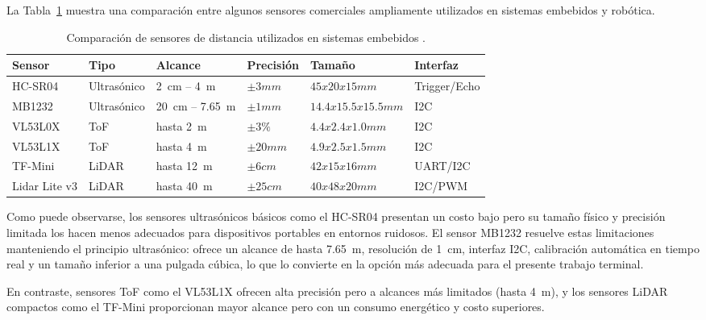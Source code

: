 La Tabla~\ref{tabla_sensores_completa} muestra una comparación entre algunos sensores comerciales ampliamente utilizados en sistemas embebidos y robótica.

\begin{table}[H]
\centering
\begin{tabular}{llllll}
\hline
Sensor & Tipo & Alcance & Precisión & Tamaño & Interfaz \\
\hline
HC-SR04 \cite{hcsr04_datasheet}          & Ultrasónico & 2~cm -- 4~m    & $\pm3 mm$    & $45x20x15 mm$      & Trigger/Echo \\
MB1232 \cite{mb1232_datasheet}           & Ultrasónico & 20~cm -- 7.65~m & $\pm1 mm$     & $14.4x15.5x15.5mm$ & I2C \\
VL53L0X \cite{vl53l0x_datasheet}         & ToF         & hasta 2~m      & $\pm3\%$     & $4.4x2.4x1.0 mm$ & I2C \\
VL53L1X \cite{vl53l1x_datasheet}         & ToF         & hasta 4~m      & $\pm20 mm$     & $4.9x2.5x1.5 mm$ & I2C \\
TF-Mini  \cite{tfmini_datasheet}          & LiDAR       & hasta 12~m     & $\pm6 cm$ & $42x15x16 mm$    & UART/I2C \\
Lidar Lite v3 \cite{lidarliitev3_manual}  & LiDAR       & hasta 40~m     & $\pm25 cm$ & $40x48x20 mm $      & I2C/PWM \\
\hline
\end{tabular}
\caption{Comparación de sensores de distancia utilizados en sistemas embebidos \cite{hcsr04_datasheet, mb1232_datasheet, vl53l0x_datasheet, vl53l1x_datasheet, tfmini_datasheet, lidarliitev3_manual}.}
\label{tabla_sensores_completa}
\end{table}

Como puede observarse, los sensores ultrasónicos básicos como el HC-SR04 \cite{hcsr04_datasheet} presentan un costo bajo pero su tamaño físico y precisión limitada los hacen menos adecuados para dispositivos portables en entornos ruidosos. El sensor MB1232 \cite{mb1232_datasheet} resuelve estas limitaciones manteniendo el principio ultrasónico: ofrece un alcance de hasta 7.65~m, resolución de 1~cm, interfaz I2C, calibración automática en tiempo real y un tamaño inferior a una pulgada cúbica, lo que lo convierte en la opción más adecuada para el presente trabajo terminal.

En contraste, sensores ToF como el VL53L1X \cite{vl53l1x_datasheet} ofrecen alta precisión pero a alcances más limitados (hasta 4~m), y los sensores LiDAR compactos como el TF-Mini \cite{tfmini_datasheet} proporcionan mayor alcance pero con un consumo energético y costo superiores.

